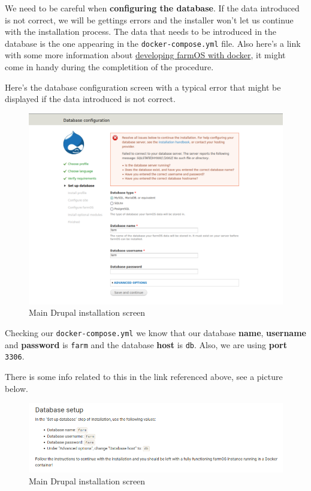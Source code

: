 We need to be careful when \textbf{configuring the database}. If the data introduced is not correct, we will be gettings errors and the installer won't let us continue with the installation process.
The data that needs to be introduced in the database is the one appearing in the \verb|docker-compose.yml| file. Also here's a link with some more information about \href{https://farmos.org/development/docker/}{developing farmOS with docker}, it might come in handy during the completition of the procedure.

Here's the database configuration screen with a typical error that might be displayed if the data introduced is not correct.
\begin{figure}[H]
    \centering
    \includegraphics[width=1\textwidth]{fig/drupal-install/db-config-drupal.png}
    \caption{Main Drupal installation screen}
    \label{fig:db-config-drupal}
\end{figure}

Checking our \verb|docker-compose.yml| we know that our database \textbf{name}, \textbf{username} and \textbf{password} is \verb|farm| and the database \textbf{host} is \verb|db|. Also, we are using \textbf{port} \verb|3306|.

There is some info related to this in the link referenced above, see a picture below.

\begin{figure}[H]
    \centering
    \includegraphics[width=1\textwidth]{fig/drupal-install/db-setup-tutorial.png}
    \caption{Main Drupal installation screen}
    \label{fig:db-setup-tutorial}
\end{figure}

